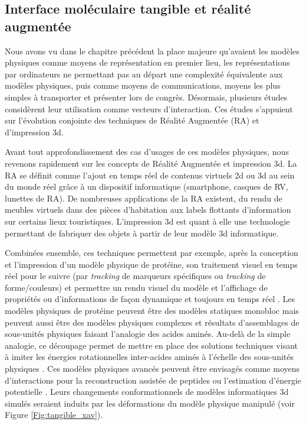\subsection{Interface moléculaire tangible et réalité augmentée}

Nous avons vu dans le chapitre précédent la place majeure qu'avaient les modèles physiques comme moyens de représentation en premier lieu, les représentations par ordinateurs ne permettant pas au départ une complexité équivalente aux modèles physiques, puis comme moyens de communications, moyens les plus simples à transporter et présenter lors de congrès. Désormais, plusieurs études considèrent leur utilisation comme vecteurs d'interaction. Ces études s'appuient sur l'évolution conjointe des techniques de Réalité Augmentée (RA) et d'impression 3d. 

Avant tout approfondissement des cas d'usages de ces modèles physiques, nous revenons rapidement sur les concepts de Réalité Augmentée et impression 3d. La RA se définit comme l'ajout en temps réel de contenus virtuels 2d ou 3d au sein du monde réel grâce à un dispositif informatique (smartphone, casques de RV, lunettes de RA). De nombreuses applications de la RA existent, du rendu de meubles virtuels dans des pièces d'habitation aux labels flottants d'information sur certains lieux touristiques. 
L'impression 3d est quant à elle une technologie permettant de fabriquer des objets à partir de leur modèle 3d informatique. 

Combinées ensemble, ces techniques permettent par exemple, après la conception et l'impression d'un modèle physique de protéine, son traitement visuel en temps réel pour le suivre (par \textit{tracking} de marqueurs spécifiques ou \textit{tracking} de forme/couleurs) et permettre un rendu visuel du modèle et l'affichage de propriétés ou d'informations de façon dynamique et toujours en temps réel \cite{gillet2005tangible}. 
Les modèles physiques de protéine peuvent être des modèles statiques monobloc mais peuvent aussi être des modèles physiques complexes et résultats d'assemblages de sous-unités physiques faisant l'analogie des acides aminés. Au-delà de la simple analogie, ce découpage permet de mettre en place des solutions techniques visant à imiter les énergies rotationnelles inter-acides aminés à l'échelle des sous-unités physiques \cite{chakraborty2013coarse}. Ces modèles physiques avancés peuvent être envisagés comme moyens d'interactions pour la reconstruction assistée de peptides ou l'estimation d'énergie potentielle \cite{martinez2015virtual}. Leurs changements conformationnels de modèles informatiques 3d simulés seraient induits par les déformations du modèle physique manipulé (voir Figure \ref{Fig:tangible_xav}).

